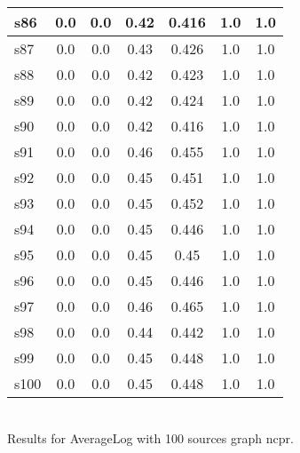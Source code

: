 \documentclass{article}
\begin{document}
\begin{tabular}{|l|c|c|c|c|c|c|}
\hline
s86 &0.0 & 0.0 & 0.42 & 0.416 & 1.0 & 1.0\\
\hline
s87 &0.0 & 0.0 & 0.43 & 0.426 & 1.0 & 1.0\\
\hline
s88 &0.0 & 0.0 & 0.42 & 0.423 & 1.0 & 1.0\\
\hline
s89 &0.0 & 0.0 & 0.42 & 0.424 & 1.0 & 1.0\\
\hline
s90 &0.0 & 0.0 & 0.42 & 0.416 & 1.0 & 1.0\\
\hline
s91 &0.0 & 0.0 & 0.46 & 0.455 & 1.0 & 1.0\\
\hline
s92 &0.0 & 0.0 & 0.45 & 0.451 & 1.0 & 1.0\\
\hline
s93 &0.0 & 0.0 & 0.45 & 0.452 & 1.0 & 1.0\\
\hline
s94 &0.0 & 0.0 & 0.45 & 0.446 & 1.0 & 1.0\\
\hline
s95 &0.0 & 0.0 & 0.45 & 0.45 & 1.0 & 1.0\\
\hline
s96 &0.0 & 0.0 & 0.45 & 0.446 & 1.0 & 1.0\\
\hline
s97 &0.0 & 0.0 & 0.46 & 0.465 & 1.0 & 1.0\\
\hline
s98 &0.0 & 0.0 & 0.44 & 0.442 & 1.0 & 1.0\\
\hline
s99 &0.0 & 0.0 & 0.45 & 0.448 & 1.0 & 1.0\\
\hline
s100 &0.0 & 0.0 & 0.45 & 0.448 & 1.0 & 1.0\\
\hline
\end{tabular}\\

\noindent Results for AverageLog with 100 sources graph ncpr.
\end{document}
